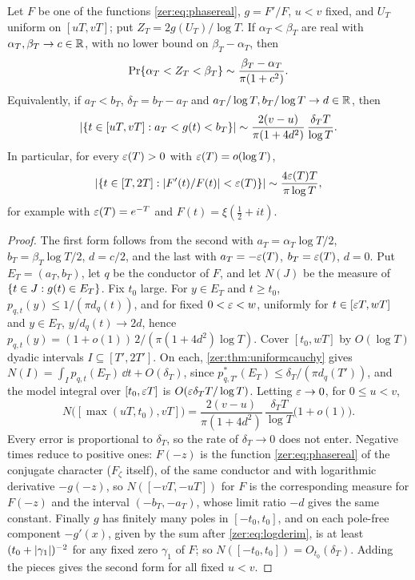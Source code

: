 \begin{corollary}\label{zer:thm:localcauchy}
Let $F$ be one of the functions \eqref{zer:eq:phasereal}, $g=F'/F$, $u<v$ fixed, and $U_T$ uniform on
$[uT,vT]$; put $Z_T=2g(U_T)/\log T$. If $\alpha_T<\beta_T$ are real with $\alpha_T,\beta_T\to c\in\mathbb{R}$, with
no lower bound on $\beta_T-\alpha_T$, then
\[
 \Pr\{\alpha_T<Z_T<\beta_T\}\sim\frac{\beta_T-\alpha_T}{\pi(1+c^2)} .
\]
Equivalently, if $a_T<b_T$, $\delta_T=b_T-a_T$ and $a_T/\log T,b_T/\log T\to d\in\mathbb{R}$, then
\[
 \lvert\{t\in[uT,vT]:a_T<g(t)<b_T\}\rvert\sim\frac{2(v-u)}{\pi(1+4d^2)}\,\frac{\delta_TT}{\log T}.
\]
In particular, for every $\varepsilon(T)>0$ with $\varepsilon(T)=o(\log T)$,
\[
 \lvert\{t\in[T,2T]:\lvert F'(t)/F(t)\rvert<\varepsilon(T)\}\rvert\sim\frac{4\varepsilon(T)T}{\pi\log T},
\]
for example with $\varepsilon(T)=e^{-T}$ and $F(t)=\xi(\tfrac12+it)$.
\end{corollary}
\begin{proof}
The first form follows from the second with $a_T=\alpha_T\log T/2$, $b_T=\beta_T\log T/2$, $d=c/2$, and the
last with $a_T=-\varepsilon(T)$, $b_T=\varepsilon(T)$, $d=0$. Put $E_T=(a_T,b_T)$, let $q$ be the conductor of $F$, and
let $N(J)$ be the measure of $\{t\in J:g(t)\in E_T\}$. Fix $t_0$ large. For $y\in E_T$ and $t\ge t_0$,
$p_{q,t}(y)\le1/(\pi d_q(t))$, and for fixed $0<\varepsilon<w$, uniformly for $t\in[\varepsilon T,wT]$ and $y\in E_T$,
$y/d_q(t)\to2d$, hence $p_{q,t}(y)=(1+o(1))\,2/(\pi(1+4d^2)\log T)$. Cover $[t_0,wT]$ by $O(\log T)$
dyadic intervals $I\subseteq[T',2T']$. On each, \cref{zer:thm:uniformcauchy} gives
$N(I)=\int_Ip_{q,t}(E_T)\,\dd t+O(\delta_T)$, since $p^*_{q,T'}(E_T)\le\delta_T/(\pi d_q(T'))$, and the model
integral over $[t_0,\varepsilon T]$ is $O(\varepsilon\delta_TT/\log T)$. Letting $\varepsilon\to0$, for $0\le u<v$,
\[
 N\bigl([\max(uT,t_0),vT]\bigr)=\frac{2(v-u)}{\pi(1+4d^2)}\,\frac{\delta_TT}{\log T}\bigl(1+o(1)\bigr).
\]
Every error is proportional to $\delta_T$, so the rate of $\delta_T\to0$ does not enter. Negative times
reduce to positive ones: $F(-z)$ is the function \eqref{zer:eq:phasereal} of the conjugate character
($F_\zeta$ itself), of the same conductor and with logarithmic derivative $-g(-z)$, so $N([-vT,-uT])$ for $F$
is the corresponding measure for $F(-z)$ and the interval $(-b_T,-a_T)$, whose limit ratio $-d$ gives the
same constant. Finally $g$ has finitely many poles in $[-t_0,t_0]$, and on each pole-free component
$-g'(x)$, given by the sum after \eqref{zer:eq:logderim}, is at least $(t_0+\lvert\gamma_1\rvert)^{-2}$ for any fixed
zero $\gamma_1$ of $F$; so $N([-t_0,t_0])=O_{t_0}(\delta_T)$. Adding the pieces gives the second form for all
fixed $u<v$.
\end{proof}

